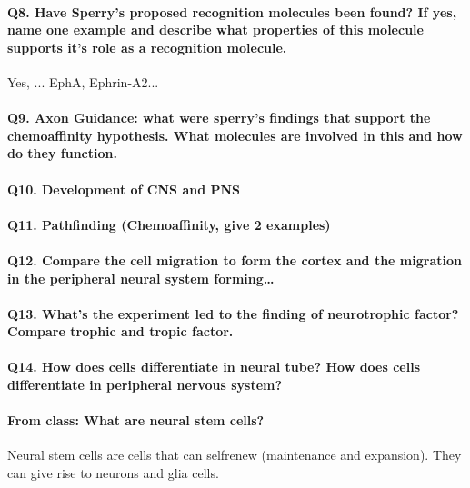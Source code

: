 \documentclass[12pt,article,oneside,a4paper]{memoir}
\begin{document}
\paragraph{Q8. Have Sperry’s proposed recognition molecules been found? If yes, name one example and describe what properties of this molecule supports it’s role as a recognition molecule.}
Yes, ...
EphA, Ephrin-A2...

\paragraph{Q9. Axon Guidance: what were sperry's findings that support the chemoaffinity hypothesis. What molecules are involved in this and how do they function.}

\paragraph{Q10. Development of CNS and PNS}

\paragraph{Q11. Pathfinding (Chemoaffinity, give 2 examples)}

\paragraph{Q12. Compare the cell migration to form the cortex and the migration in the peripheral neural system forming…}

\paragraph{Q13. What’s the experiment led to the finding of neurotrophic factor? Compare trophic and tropic factor.}

\paragraph{Q14. How does cells differentiate in neural tube? How does cells differentiate in peripheral nervous system?}

\paragraph{From class: What are neural stem cells?}
Neural stem cells are cells that can self­renew (maintenance and expansion). They can give rise to neurons and glia cells.
\end{document}

